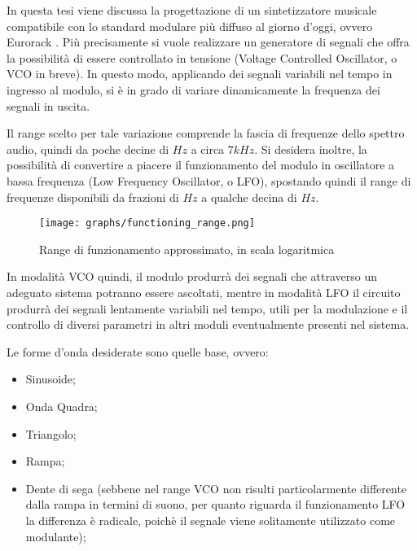 

In questa tesi viene discussa la progettazione di un sintetizzatore musicale compatibile con
lo standard modulare più diffuso al giorno d'oggi, ovvero Eurorack \cite{eurorack}. Più
precisamente si vuole realizzare un generatore di segnali che offra la possibilità di essere
controllato in tensione (Voltage Controlled Oscillator, o VCO in breve). In questo modo,
applicando dei segnali variabili nel tempo in ingresso al modulo, si è in grado di variare
dinamicamente la frequenza dei segnali in uscita.

Il range scelto per tale variazione comprende la fascia di frequenze dello spettro audio,
quindi da poche decine di $Hz$ a circa $7kHz$. Si desidera inoltre, la possibilità di
convertire a piacere il funzionamento del modulo in oscillatore a bassa frequenza (Low Frequency
Oscillator, o LFO), spostando quindi il range di frequenze disponibili da frazioni di
$Hz$ a qualche decina di $Hz$.
\medskip

\begin{figure}[ht]
    \centering
    \texttt{[image: graphs/functioning\_range.png]}
    \caption{Range di funzionamento approssimato, in scala logaritmica}
    \label{functioning_range}
\end{figure}

In modalità VCO quindi, il modulo produrrà dei segnali che attraverso un adeguato sistema
potranno essere ascoltati, mentre in modalità LFO il circuito produrrà dei segnali lentamente
variabili nel tempo, utili per la modulazione e il controllo di diversi parametri in altri
moduli eventualmente presenti nel sistema.

Le forme d'onda desiderate sono quelle base, ovvero:

\begin{itemize}
    \item Sinusoide;
    \item Onda Quadra;
    \item Triangolo;
    \item Rampa;
    \item Dente di sega (sebbene nel range VCO non risulti particolarmente differente dalla
          rampa in termini di suono, per quanto riguarda il funzionamento LFO la differenza
          è radicale, poichè il segnale viene solitamente utilizzato come modulante);
\end{itemize}

